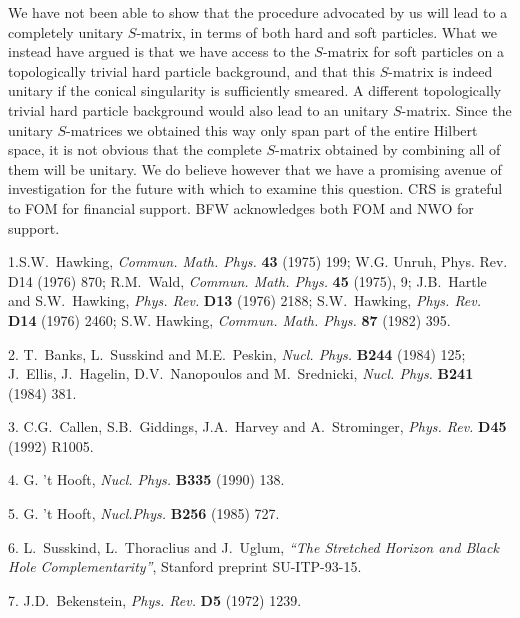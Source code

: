 We have not been able to show that the procedure advocated by us will
lead to a completely unitary $S$-matrix, in terms of both hard and soft
particles. What we instead have argued is that we have access to the
$S$-matrix for soft particles on a topologically trivial hard particle
background, and that this $S$-matrix is indeed unitary if the conical
singularity is sufficiently smeared.  A different topologically trivial
hard particle background would also lead to an unitary $S$-matrix.
Since the unitary $S$-matrices we obtained this way only span part of
the entire Hilbert space, it is not obvious that the complete
$S$-matrix obtained by combining all of them will be unitary.  We do
believe however that we have a promising avenue of investigation for
the future with which to examine this question.
\bigskip
{}
\medskip
CRS is grateful to FOM for financial support. BFW acknowledges both FOM
and NWO for support.
\bigskip
{}

\vglue 0.4cm \item{1.}S.W.~Hawking, {\it Commun. Math. Phys.} {\bf 43}
(1975) 199; W.G. Unruh, Phys. Rev. D14 (1976) 870; R.M.~Wald, {\it
Commun. Math. Phys.} {\bf 45} (1975), 9; J.B.~Hartle and S.W.~Hawking,
{\it Phys.  Rev.} {\bf D13} (1976) 2188; S.W.~Hawking, {\it Phys. Rev.}
{\bf D14} (1976) 2460; S.W. Hawking, {\it Commun. Math. Phys.} {\bf 87}
(1982) 395.

\item{2.} T.~Banks, L.~Susskind and M.E.~Peskin, {\it Nucl. Phys.} {\bf
B244} (1984) 125; J.~Ellis, J.~Hagelin, D.V.~Nanopoulos and
M.~Srednicki, {\it Nucl.  Phys.} {\bf B241} (1984) 381.

\item{3.} C.G.~Callen, S.B.~Giddings, J.A.~Harvey and A.~Strominger,
{\it Phys. Rev.} {\bf D45} (1992) R1005.

\item{4.} G. 't Hooft, {\it Nucl. Phys.} {\bf B335} (1990) 138.

\item{5.} G. 't Hooft, {\it Nucl.Phys.} {\bf B256} (1985) 727.

\item{6.} L.~Susskind, L.~Thoraclius and J.~Uglum, {\it ``The Stretched
Horizon and Black Hole Complementarity''}, Stanford preprint
SU-ITP-93-15.

\item{7.} J.D.~Bekenstein, {\it Phys. Rev.} {\bf D5} (1972) 1239.


